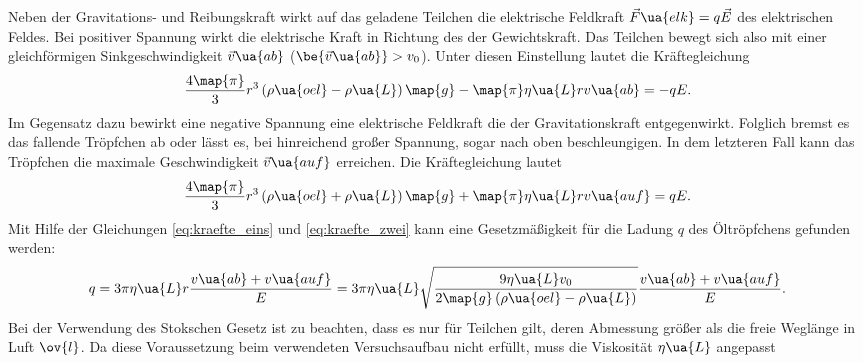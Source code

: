 Neben der Gravitations- und Reibungskraft wirkt auf das geladene Teilchen
die elektrische Feldkraft $\vec{F}\ua{elk}=q\vec{E}$ des elektrischen Feldes.
Bei positiver Spannung wirkt die elektrische Kraft in Richtung des der Gewichtskraft.
Das Teilchen bewegt sich also mit einer gleichförmigen Sinkgeschwindigkeit $\vec{v}\ua{ab}$ ($\be{\vec{v}\ua{ab}}>v_0$).
Unter diesen Einstellung lautet die Kräftegleichung
\begin{equation}
  \label{eq:kraefte_eins}
    \frac{4\map{\pi}}{3}r^3\left(\rho\ua{oel}-\rho\ua{L}\right)\map{g}-\map{\pi}\eta\ua{L}r v\ua{ab}=-qE.
\end{equation}
Im Gegensatz dazu bewirkt eine negative Spannung eine elektrische Feldkraft die der Gravitationskraft
entgegenwirkt. Folglich bremst es das fallende Tröpfchen ab oder
lässt es, bei hinreichend großer Spannung, sogar nach oben beschleungigen.
In dem letzteren Fall kann das Tröpfchen die maximale Geschwindigkeit $\vec{v}\ua{auf}$ erreichen.
Die Kräftegleichung lautet
\begin{equation}
  \label{eq:kraefte_zwei}
    \frac{4\map{\pi}}{3}r^3\left(\rho\ua{oel}+\rho\ua{L}\right)\map{g}+\map{\pi}\eta\ua{L}r v\ua{auf}=qE.
\end{equation}
Mit Hilfe der Gleichungen \eqref{eq:kraefte_eins} und \eqref{eq:kraefte_zwei} kann eine Gesetzmäßigkeit
für die Ladung $q$ des Öltröpfchens gefunden werden:
\begin{equation}
  \label{eq:ladung}
  q=3\pi\eta\ua{L}r\frac{v\ua{ab}+v\ua{auf}}{E}=3\pi\eta\ua{L}\sqrt{\frac{9\eta\ua{L}v_0}{2\map{g}\left(\rho\ua{oel}-\rho\ua{L}\right)}}\frac{v\ua{ab}+v\ua{auf}}{E}.
\end{equation}
Bei der Verwendung des Stokschen Gesetz ist zu beachten, dass es nur für Teilchen gilt,
deren Abmessung größer als die freie Weglänge in Luft $\ov{l}$.
Da diese Voraussetzung beim verwendeten Versuchsaufbau nicht erfüllt, muss die Viskosität $\eta\ua{L}$
angepasst
